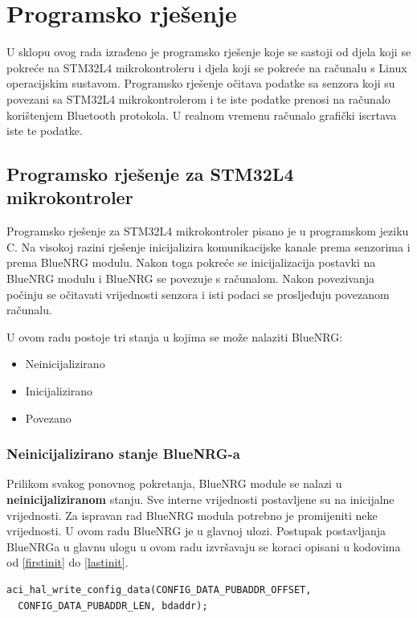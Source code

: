 \documentclass[times, utf8, diplomski]{diplomski}
\begin{document}
\chapter{Programsko rješenje}
U sklopu ovog rada izrađeno je programsko rješenje koje se sastoji od djela koji se pokreće na STM32L4 mikrokontroleru i djela koji se pokreće na računalu s Linux operacijskim sustavom.
Programsko rješenje očitava podatke sa senzora koji su povezani sa STM32L4 mikrokontrolerom i te iste podatke prenosi na računalo korištenjem Bluetooth protokola.
U realnom vremenu računalo grafički iscrtava iste te podatke.

\section{Programsko rješenje za STM32L4 mikrokontroler}
Programsko rješenje za STM32L4 mikrokontroler pisano je u programskom jeziku C.
Na visokoj razini rješenje inicijalizira komunikacijske kanale prema senzorima i prema BlueNRG modulu.
Nakon toga pokreće se inicijalizacija postavki na BlueNRG modulu i BlueNRG se povezuje s računalom.
Nakon povezivanja počinju se očitavati vrijednosti senzora i isti podaci se prosljeđuju povezanom računalu.

U ovom radu postoje tri stanja u kojima se može nalaziti BlueNRG:

\begin{itemize}
  \item Neinicijalizirano
  \item Inicijalizirano
  \item Povezano
\end{itemize}

\subsection{Neinicijalizirano stanje BlueNRG-a}
Prilikom svakog ponovnog pokretanja, BlueNRG module se nalazi u \textbf{neinicijaliziranom} stanju. Sve interne vrijednosti postavljene su na inicijalne vrijednosti. Za ispravan rad BlueNRG modula potrebno je promijeniti neke vrijednosti. U ovom radu BlueNRG je u glavnoj ulozi. Postupak postavljanja BlueNRGa u glavnu ulogu u ovom radu izvršavaju se koraci opisani u kodovima od \ref{firstinit} do \ref{lastinit}.

\begin{lstlisting}[caption={Postavi MAC adresu}, label={firstinit}]
aci_hal_write_config_data(CONFIG_DATA_PUBADDR_OFFSET,
  CONFIG_DATA_PUBADDR_LEN, bdaddr);
\end{lstlisting}
\end{document}
